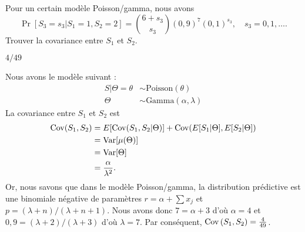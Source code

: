 \begin{exercice}
  Pour un certain modèle Poisson/gamma, nous avons
  \begin{equation*}
    \Pr[S_3 = s_{3}|S_1 = 1, S_2 = 2] =
    \binom{6 + s_3}{s_3} (0,9)^7 (0,1)^{s_3}, \quad
    s_3 = 0, 1, \dots.
  \end{equation*}
  Trouver la covariance entre $S_{1}$ et $S_{2}$.
  \begin{rep}
    $4/49$
  \end{rep}
  \begin{sol}
    Nous avons le modèle suivant :
    \begin{align*}
      S|\Theta = \theta
      &\sim \text{Poisson}(\theta) \\
      \Theta
      &\sim \text{Gamma}(\alpha, \lambda)
    \end{align*}
    La covariance entre $S_1$ et $S_2$ est
    \begin{align*}
      \operatorname{Cov}(S_1, S_2)
      &= E [ \operatorname{Cov}(S_1, S_2|\Theta) ] +
      \operatorname{Cov}(E [ S_1|\Theta ], E [ S_2|\Theta ]) \\
      &= \operatorname{Var} [ \mu(\Theta) ] \\
      &= \operatorname{Var} [ \Theta ] \\
      &= \frac{\alpha}{\lambda^2}.
    \end{align*}
    Or, nous savons que dans le modèle Poisson/gamma, la distribution
    prédictive est une binomiale négative de paramètres
    $r = \alpha + \sum x_j$ et $p = (\lambda + n)/(\lambda + n + 1)$.
    Nous avons donc $7 = \alpha + 3$ d'où $\alpha = 4$ et
    $0,9 = (\lambda + 2)/(\lambda + 3)$ d'où $\lambda = 7$. Par
    conséquent, $\operatorname{Cov}{(S_1, S_2)} = \frac{4}{49}$.
  \end{sol}
\end{exercice}

